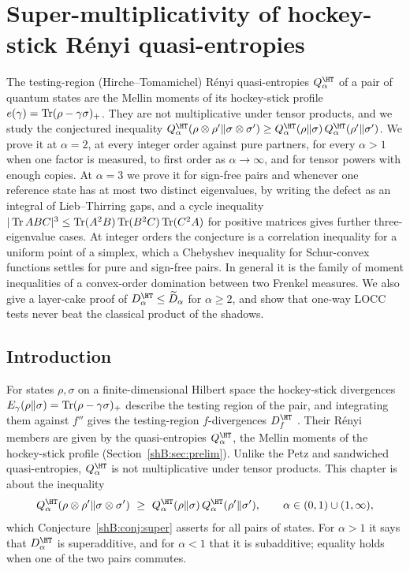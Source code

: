 \chapter{Super-multiplicativity of hockey-stick R\'enyi quasi-entropies}\label{shB:chapter}
%
\begingroup
{}

\begin{chaptersummary}
The testing-region (Hirche--Tomamichel) R\'enyi quasi-entropies $Q^\HT_\alpha$ of a pair of quantum states are the Mellin moments of its hockey-stick profile $e(\gamma)=\operatorname{Tr}(\rho-\gamma\sigma)_+$. They are not multiplicative under tensor products, and we study the conjectured inequality $Q^\HT_\alpha(\rho\otimes\rho'\|\sigma\otimes\sigma')\ge Q^\HT_\alpha(\rho\|\sigma)\,Q^\HT_\alpha(\rho'\|\sigma')$. We prove it at $\alpha=2$, at every integer order against pure partners, for every $\alpha>1$ when one factor is measured, to first order as $\alpha\to\infty$, and for tensor powers with enough copies. At $\alpha=3$ we prove it for sign-free pairs and whenever one reference state has at most two distinct eigenvalues, by writing the defect as an integral of Lieb--Thirring gaps, and a cycle inequality $|\operatorname{Tr} ABC|^3\le\operatorname{Tr}(A^2B)\operatorname{Tr}(B^2C)\operatorname{Tr}(C^2A)$ for positive matrices gives further three-eigenvalue cases. At integer orders the conjecture is a correlation inequality for a uniform point of a simplex, which a Chebyshev inequality for Schur-convex functions settles for pure and sign-free pairs. In general it is the family of moment inequalities of a convex-order domination between two Frenkel measures. We also give a layer-cake proof of $D^\HT_\alpha\le\widetilde D_\alpha$ for $\alpha\ge2$, and show that one-way LOCC tests never beat the classical product of the shadows.
\end{chaptersummary}

\section{Introduction}\label{shB:sec:intro}

For states $\rho,\sigma$ on a finite-dimensional Hilbert space the hockey-stick divergences $E_\gamma(\rho\|\sigma)=\operatorname{Tr}(\rho-\gamma\sigma)_+$ describe the testing region of the pair, and integrating them against $f''$ gives the testing-region $f$-divergences $D^\HT_f$ \cite{HircheTomamichel2024}. Their R\'enyi members are given by the quasi-entropies $Q^\HT_\alpha$, the Mellin moments of the hockey-stick profile (Section~\ref{shB:sec:prelim}). Unlike the Petz and sandwiched quasi-entropies, $Q^\HT_\alpha$ is not multiplicative under tensor products. This chapter is about the inequality
\[
Q^\HT_\alpha(\rho\otimes\rho'\|\sigma\otimes\sigma')\ \ge\ Q^\HT_\alpha(\rho\|\sigma)\,Q^\HT_\alpha(\rho'\|\sigma'),\qquad\alpha\in(0,1)\cup(1,\infty),
\]
which Conjecture~\ref{shB:conj:super} asserts for all pairs of states. For $\alpha>1$ it says that $D^\HT_\alpha$ is superadditive, and for $\alpha<1$ that it is subadditive; equality holds when one of the two pairs commutes.

